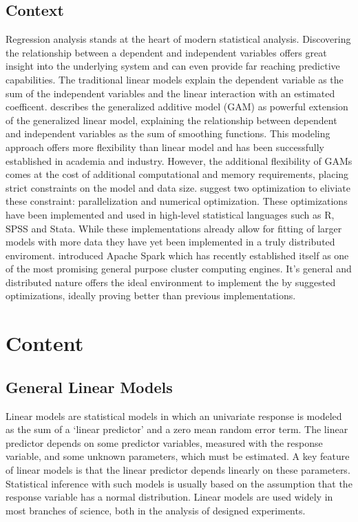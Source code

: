 \documentclass{article}
\begin{document}
    \subsection{Context}
    Regression analysis stands at the heart of modern statistical analysis. Discovering the relationship between a dependent and independent variables offers great insight into the underlying system and can even provide far reaching predictive capabilities. The traditional linear models explain the dependent variable as the sum of the independent variables and the linear interaction with an estimated coefficent.\cite{gamBook} describes the generalized additive model (GAM) as powerful extension of the generalized linear model, explaining the relationship between dependent and independent variables as the sum of smoothing functions. This modeling approach offers more flexibility than linear model and has been successfully established in academia and industry. However, the additional flexibility of GAMs comes at the cost of additional computational and memory requirements, placing strict constraints on the model and data size.\cite{bigdataGAM} suggest two optimization to eliviate these constraint: parallelization and numerical optimization.
    These optimizations have been implemented and used in high-level statistical languages such as R, SPSS and Stata. While these implementations already allow for fitting of larger models with more data they have yet been implemented in a truly distributed enviroment.\cite{spark} introduced Apache Spark which has recently established itself as one of the most promising general purpose cluster computing engines. It's general and distributed nature offers the ideal environment to implement the by \cite{bigdataGAM} suggested optimizations, ideally proving better than previous implementations.


    \section{Content}
    \subsection{General Linear Models}
    Linear models are statistical models in which an univariate response is modeled as the sum of a ‘linear predictor’ and a zero mean random error term. The linear predictor depends on some predictor variables, measured with the response variable, and some unknown parameters, which must be estimated. A key feature of linear models is that the linear predictor depends linearly on these parameters. Statistical inference with such models is usually based on the assumption that the response variable has a normal distribution. Linear models are used widely in most branches of science, both in the analysis of designed experiments. \
\end{document}
